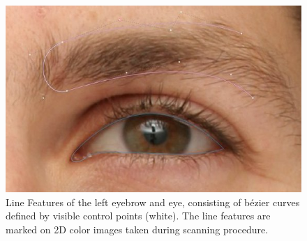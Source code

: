 \begin{figure}[h!]
    \centering
\includegraphics[width=\textwidth]{./resources/img/eyebrow_left.jpeg}
\caption{Line Features of the left eyebrow and eye, consisting of b\'{e}zier curves defined by visible control points (white). The line features are marked on 2D color images taken during scanning procedure.}
\label{fig:linefeatures}
\end{figure}

